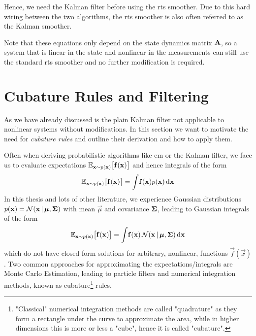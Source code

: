 		Hence, we need the Kalman filter before using the \ac{rts} smoother. Due to this hard wiring between the two algorithms, the \ac{rts} smoother is also often referred to as the Kalman smoother.

		Note that these equations only depend on the state dynamics matrix \( \boldsymbol{\mathrm{A}} \), so a system that is linear in the state and nonlinear in the measurements can still use the standard \ac{rts} smoother and no further modification is required.

\section{Cubature Rules and Filtering}
	\label{sec:cubatureFiltering}

	As we have already discussed is the plain Kalman filter not applicable to nonlinear systems without modifications. In this section we want to motivate the need for \emph{cubature rules} and outline their derivation and how to apply them.

	Often when deriving probabilistic algorithms like \ac{em} or the Kalman filter, we face us to evaluate expectations \( \mathbb{E}_{\boldsymbol{\mathrm{x}} \sim p(\boldsymbol{\mathrm{x}})}\big[ \boldsymbol{\mathrm{f}}(\boldsymbol{\mathrm{x}}) \big] \) and hence integrals of the form
	\begin{equation*}
		\mathbb{E}_{\boldsymbol{\mathrm{x}} \sim p(\boldsymbol{\mathrm{x}})}\big[ \boldsymbol{\mathrm{f}}(\boldsymbol{\mathrm{x}}) \big] = \int\! \boldsymbol{\mathrm{f}}(\boldsymbol{\mathrm{x}}) p(\boldsymbol{\mathrm{x}}) \dd{\boldsymbol{\mathrm{x}}}
	\end{equation*}
	In this thesis and lots of other literature, we experience Gaussian distributions \( p(\boldsymbol{\mathrm{x}}) = \mathcal{N}(\boldsymbol{\mathrm{x}} \,\vert\, \boldsymbol{\mathrm{\mu}}, \boldsymbol{\mathrm{\Sigma}}) \) with mean \(\vec{\mu}\) and covariance \(\boldsymbol{\mathrm{\Sigma}}\), leading to Gaussian integrals of the form
	\begin{equation*}
		\mathbb{E}_{\boldsymbol{\mathrm{x}} \sim p(\boldsymbol{\mathrm{x}})}\big[ \boldsymbol{\mathrm{f}}(\boldsymbol{\mathrm{x}}) \big] = \int\! \boldsymbol{\mathrm{f}}(\boldsymbol{\mathrm{x}}) \, \mathcal{N}(\boldsymbol{\mathrm{x}} \,\vert\, \boldsymbol{\mathrm{\mu}}, \boldsymbol{\mathrm{\Sigma}}) \dd{\boldsymbol{\mathrm{x}}}
	\end{equation*}
	which do not have closed form solutions for arbitrary, nonlinear, functions \( \vec{f}(\vec{x}) \). Two common approaches for approximating the expectations/integrals are Monte Carlo Estimation, leading to particle filters and numerical integration methods, known as cubature\footnote{"Classical" numerical integration methods are called "quadrature" as they form a rectangle under the curve to approximate the area, while in higher dimensions this is more or less a "cube", hence it is called "cubature".} rules.

